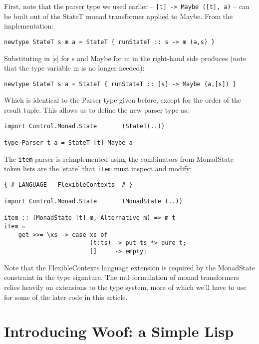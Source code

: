 \documentclass{tmr}
\begin{document}
First, note that the parser type we used earlier -- \verb+[t] -> Maybe ([t], a)+
-- can be built out of the StateT monad transformer applied to Maybe.
From the implementation:
\begin{verbatim}
newtype StateT s m a = StateT { runStateT :: s -> m (a,s) }
\end{verbatim}
Substituting in [s] for s and Maybe for m in the right-hand side produces
(note that the type variable m is no longer needed):
\begin{verbatim}
newtype StateT s a = StateT { runStateT :: [s] -> Maybe (a,[s]) }
\end{verbatim}
Which is identical to the Parser type given before, except for the order 
of the result tuple.
This allows us to define the new parser type as:
\begin{verbatim}
import Control.Monad.State       (StateT(..))

type Parser t a = StateT [t] Maybe a
\end{verbatim}

The \verb+item+ parser is reimplemented using the combinators from MonadState --
token lists are the `state' that \verb+item+ must inspect and modify:
\begin{verbatim}
{-# LANGUAGE   FlexibleContexts  #-}

import Control.Monad.State       (MonadState (..))

item :: (MonadState [t] m, Alternative m) => m t
item =
    get >>= \xs -> case xs of
                        (t:ts) -> put ts *> pure t;
                        []     -> empty;
\end{verbatim}
Note that the FlexibleContexts language extension is required by the 
MonadState constraint in the type signature.  The mtl   formulation of monad
transformers relies heavily on extensions to the type system, more of which 
we'll have to use for some of the later code in this article.




\section{Introducing Woof:  a Simple Lisp}

\end{document}

